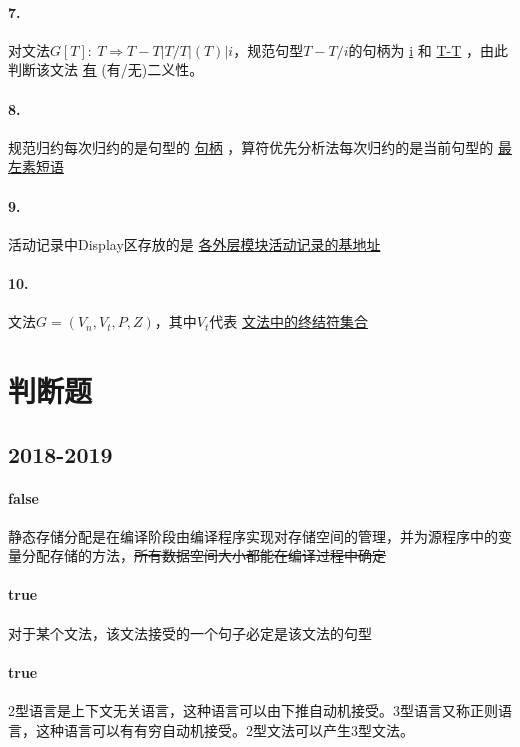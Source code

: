 \documentclass[UTF8]{ctexart} %
\begin{document}
\paragraph{7.} 对文法$G[T]:\ T\Rightarrow T-T|T/T|(T)|i$，规范句型$T-T/i$的句柄为 \underline{i} 和 \underline{T-T} ，由此判断该文法 \underline{有} (有/无)二义性。

\paragraph{8.} 规范归约每次归约的是句型的 \underline{句柄} ，算符优先分析法每次归约的是当前句型的 \underline{最左素短语}

\paragraph{9.} 活动记录中Display区存放的是 \underline{各外层模块活动记录的基地址}

\paragraph{10.} 文法$G=(V_n,V_t,P,Z)$，其中$V_t$代表 \underline{文法中的终结符集合}

\section{判断题}

\subsection{2018-2019}

\paragraph{false} 静态存储分配是在编译阶段由编译程序实现对存储空间的管理，并为源程序中的变量分配存储的方法，\sout{所有数据空间大小都能在编译过程中确定}

\paragraph{true} 对于某个文法，该文法接受的一个句子必定是该文法的句型

\paragraph{true} 2型语言是上下文无关语言，这种语言可以由下推自动机接受。3型语言又称正则语言，这种语言可以有有穷自动机接受。2型文法可以产生3型文法。
\end{document}
